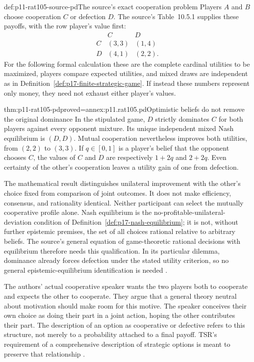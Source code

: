 \begin{hbexample}{def:p11-rat105-source-pd}{The source's exact cooperation problem}
Players \(A\) and \(B\) choose cooperation \(C\) or defection \(D\).
The source's Table~10.5.1 supplies these payoffs, with the row player's
value first:
\[
 \begin{array}{c|cc}
       &C&D\\ \hline
 C&(3,3)&(1,4)\\
 D&(4,1)&(2,2).
 \end{array}
\]
For the following formal calculation these are the complete cardinal
utilities to be maximized, players compare expected utilities, and
mixed draws are independent as in
Definition~\ref{def:p17-finite-strategic-game}. If instead these numbers
represent only money, they need not exhaust either player's values.
\end{hbexample}

\begin{hbtheorem}{thm:p11-rat105-pd}{proved=annex:p11.rat105.pd}{Optimistic beliefs do not remove the original dominance}
In the stipulated game, \(D\) strictly dominates \(C\) for both players
against every opponent mixture. Its unique independent mixed Nash
equilibrium is \((D,D)\). Mutual cooperation nevertheless improves both
utilities, from \((2,2)\) to \((3,3)\). If \(q\in[0,1]\) is a
player's belief that the opponent chooses \(C\), the values of \(C\)
and \(D\) are respectively \(1+2q\) and \(2+2q\). Even certainty
of the other's cooperation leaves a utility gain of one from defection.
\end{hbtheorem}

The mathematical result distinguishes unilateral improvement with the
other's choice fixed from comparison of joint outcomes. It does not make
efficiency, consensus, and rationality identical. Neither participant can
select the mutually cooperative profile alone. Nash equilibrium is the
no-profitable-unilateral-deviation condition of
Definition~\ref{def:p17-nash-equilibrium}; it is not, without further
epistemic premises, the set of all choices rational relative to arbitrary
beliefs. The source's general equation of game-theoretic rational
decisions with equilibrium therefore needs this qualification. In its
particular dilemma, dominance already forces defection under the stated
utility criterion, so no general epistemic-equilibrium identification
is needed \parencite[p.~626]{NidaRumelinGutwaldZuber2021}.

The authors' actual cooperative speaker wants the two players both to
cooperate and expects the other to cooperate. They argue that a general
theory neutral about motivation should make room for this motive.
The speaker conceives their own choice as doing their part in a joint
action, hoping the other contributes their part. The description of an
option as cooperative or defective refers to this structure, not merely
to a probability attached to a final payoff. TSR's requirement of a
comprehensive description of strategic options is meant to preserve that
relationship \parencite[p.~627]{NidaRumelinGutwaldZuber2021}.

